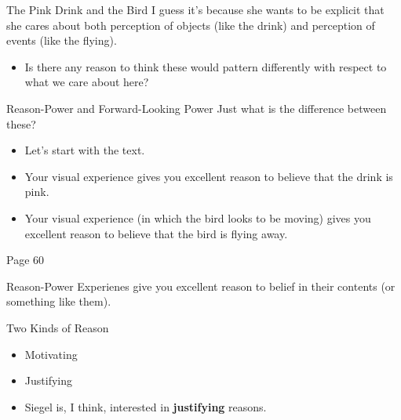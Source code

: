 \documentclass[
  17pt,
  letterpaper,
  ignorenonframetext,
  aspectratio=169,
  xcolor={dvipsnames}]{beamer}
\providecommand{\tightlist}{%
  \setlength{\itemsep}{0pt}\setlength{\parskip}{0pt}}\usepackage{longtable,booktabs,array}
\begin{document}
\begin{frame}{The Pink Drink and the Bird}
\protect\hypertarget{the-pink-drink-and-the-bird-1}{}
I guess it's because she wants to be explicit that she cares about both
perception of objects (like the drink) and perception of events (like
the flying).

\begin{itemize}[<+->]
\tightlist
\item
  Is there any reason to think these would pattern differently with
  respect to what we care about here?
\end{itemize}
\end{frame}

\begin{frame}{Reason-Power and Forward-Looking Power}
\protect\hypertarget{reason-power-and-forward-looking-power}{}
Just what is the difference between these?

\begin{itemize}[<+->]
\tightlist
\item
  Let's start with the text.
\end{itemize}

\end{frame} \begin{frame}[plain]

\begin{itemize}[<+->]
\tightlist
\item
  Your visual experience gives you excellent reason to believe that the
  drink is pink.
\item
  Your visual experience (in which the bird looks to be moving) gives
  you excellent reason to believe that the bird is flying away.
\end{itemize}

Page 60
\end{frame}

\begin{frame}{Reason-Power}
\protect\hypertarget{reason-power}{}
Experienes give you excellent reason to belief in their contents (or
something like them).
\end{frame}

\begin{frame}{Two Kinds of Reason}
\protect\hypertarget{two-kinds-of-reason}{}
\begin{itemize}[<+->]
\tightlist
\item
  Motivating
\item
  Justifying
\item
  Siegel is, I think, interested in \textbf{justifying} reasons.
\end{itemize}
\end{frame}
\end{document}
